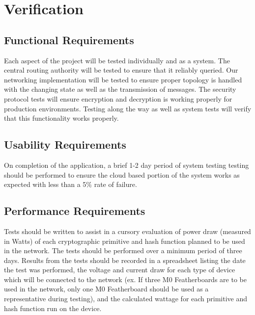 \documentclass[tikz,a4paper,titlepage]{article}
\begin{document}
\section{Verification}

\subsection{Functional Requirements}

Each aspect of the project will be tested individually and as a system. The central routing authority will be tested to ensure that it reliably queried. Our networking implementation will be tested to ensure proper topology is handled with the changing state as well as the transmission of messages. The security protocol tests will ensure encryption and decryption is working properly for production environments. Testing along the way as well as system tests will verify that this functionality works properly.



\subsection{Usability Requirements} %

On completion of the application, a brief 1-2 day period of system testing testing should be performed to ensure the cloud based portion of the system works as expected with less than a 5\% rate of failure.

\subsection{Performance Requirements} %

Tests should be written to assist in a cursory evaluation of power draw (measured in Watts) of each cryptographic primitive and hash function planned to be used in the network. The tests should be performed over a minimum period of three days. Results from the tests should be recorded in a spreadsheet listing the date the test was performed, the voltage and current draw for each type of device which will be connected to the network (ex. If three M0 Featherboards are to be used in the network, only one M0 Featherboard should be used as a representative during testing), and the calculated wattage for each primitive and hash function run on the device.
\end{document}
